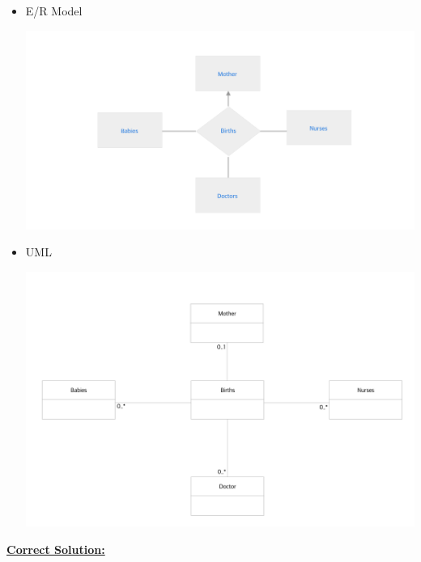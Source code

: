 \documentclass[12pt]{article}
\begin{document}
\begin{enumerate}[1.]
\begin{enumerate}[a)]
        \begin{itemize}
            \item E/R Model
            \begin{center}
            \includegraphics[width=\linewidth]{images/worksheet_15_solution_25.png}
            \end{center}

            \item UML

            \begin{center}
            \includegraphics[width=\linewidth]{images/worksheet_15_solution_27.png}
            \end{center}
        \end{itemize}

        \begin{mdframed}
            \underline{\textbf{Correct Solution:}}

            \bigskip


\end{mdframed}
\end{enumerate}
\end{enumerate}
\end{document}

